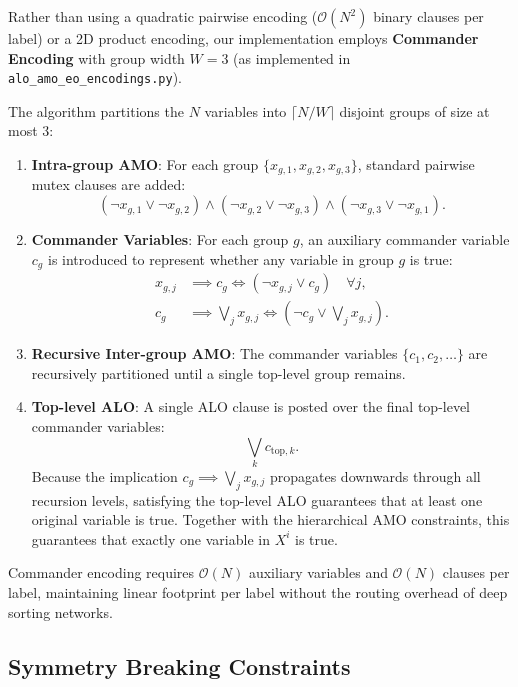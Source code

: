 \documentclass[a4paper,fleqn]{cas-sc}
\begin{document}
Rather than using a quadratic pairwise encoding ($\mathcal{O}(N^2)$ binary clauses per label) or a 2D product encoding, our implementation employs \textbf{Commander Encoding} \citep{klieber2007efficient} with group width $W = 3$ (as implemented in \texttt{alo\_amo\_eo\_encodings.py}).

The algorithm partitions the $N$ variables into $\lceil N/W \rceil$ disjoint groups of size at most 3:
\begin{enumerate}
    \item \textbf{Intra-group AMO}: For each group $\{x_{g,1}, x_{g,2}, x_{g,3}\}$, standard pairwise mutex clauses are added:
    \begin{equation}
        (\neg x_{g,1} \lor \neg x_{g,2}) \land (\neg x_{g,2} \lor \neg x_{g,3}) \land (\neg x_{g,3} \lor \neg x_{g,1}).
    \end{equation}
    \item \textbf{Commander Variables}: For each group $g$, an auxiliary commander variable $c_g$ is introduced to represent whether any variable in group $g$ is true:
    \begin{align}
        x_{g,j} &\implies c_g \iff (\neg x_{g,j} \lor c_g) \quad \forall j, \\
        c_g &\implies \bigvee_{j} x_{g,j} \iff \left(\neg c_g \lor \bigvee_{j} x_{g,j}\right).
    \end{align}
    \item \textbf{Recursive Inter-group AMO}: The commander variables $\{c_1, c_2, \dots\}$ are recursively partitioned until a single top-level group remains.
    \item \textbf{Top-level ALO}: A single ALO clause is posted over the final top-level commander variables:
    \begin{equation}
        \bigvee_{k} c_{\text{top}, k}.
    \end{equation}
    Because the implication $c_g \implies \bigvee_j x_{g,j}$ propagates downwards through all recursion levels, satisfying the top-level ALO guarantees that at least one original variable is true. Together with the hierarchical AMO constraints, this guarantees that exactly one variable in $X^i$ is true.
\end{enumerate}
Commander encoding requires $\mathcal{O}(N)$ auxiliary variables and $\mathcal{O}(N)$ clauses per label, maintaining linear footprint per label without the routing overhead of deep sorting networks.

\subsection{Symmetry Breaking Constraints}
\end{document}

